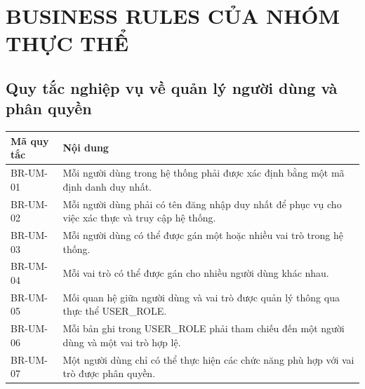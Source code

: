 \section{BUSINESS RULES CỦA NHÓM THỰC THỂ}

\subsection{Quy tắc nghiệp vụ về quản lý người dùng và phân quyền}
\begin{center}
\begin{longtable}{|>{\raggedright\arraybackslash}p{3.5cm}|>{\raggedright\arraybackslash}p{11.0cm}|}
\hline
\textbf{Mã quy tắc} & \textbf{Nội dung} \\ \hline
\endhead
BR-UM-01 & Mỗi người dùng trong hệ thống phải được xác định bằng một mã định danh duy nhất. \\ \hline
BR-UM-02 & Mỗi người dùng phải có tên đăng nhập duy nhất để phục vụ cho việc xác thực và truy cập hệ thống. \\ \hline
BR-UM-03 & Mỗi người dùng có thể được gán một hoặc nhiều vai trò trong hệ thống. \\ \hline
BR-UM-04 & Mỗi vai trò có thể được gán cho nhiều người dùng khác nhau. \\ \hline
BR-UM-05 & Mối quan hệ giữa người dùng và vai trò được quản lý thông qua thực thể USER\_ROLE. \\ \hline
BR-UM-06 & Mỗi bản ghi trong USER\_ROLE phải tham chiếu đến một người dùng và một vai trò hợp lệ. \\ \hline
BR-UM-07 & Một người dùng chỉ có thể thực hiện các chức năng phù hợp với vai trò được phân quyền. \\ \hline
\end{longtable}
\end{center}

